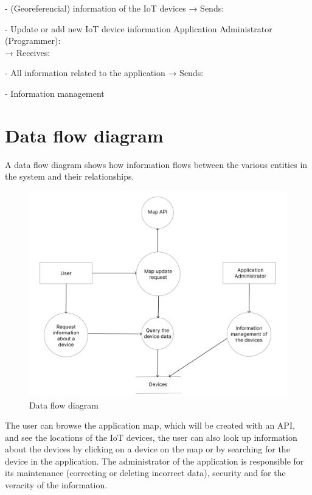\documentclass{scrreprt}
\begin{document}
- (Georeferencial) information of the IoT devices
\newline
→ Sends:

- Update or add new IoT device information \newline
\newline
Application Administrator (Programmer): \\
\newline
→ Receives:

- All information related to the application
\newline
→ Sends:

- Information management

\section{Data flow diagram}

A data flow diagram shows how information flows between the various entities
in the system and their relationships.
\begin{figure}[H]
    \centering
    \includegraphics[width=15cm]{assets/images/data_flow_diagram.png}
    \caption{Data flow diagram}
    \label{fig:data flow diagram}
\end{figure}
The user can browse the application map, which will be created with an API,
and see the locations of the IoT devices, the user can also look up information
about the devices by clicking on a device on the map or by searching for
the device in the application. The administrator of the application is responsible for
its maintenance (correcting or deleting incorrect data), security and for
the veracity of the information.
\end{document}
